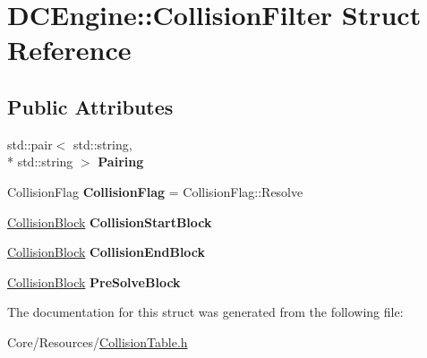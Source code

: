 \hypertarget{structDCEngine_1_1CollisionFilter}{\section{D\-C\-Engine\-:\-:Collision\-Filter Struct Reference}
\label{structDCEngine_1_1CollisionFilter}
}
\subsection*{Public Attributes}
\begin{DoxyCompactItemize}
\item 
\hypertarget{structDCEngine_1_1CollisionFilter_a2461259b77abd0b038f93900ffcf05d9}{std\-::pair$<$ std\-::string, \\*
std\-::string $>$ {\bfseries Pairing}}\label{structDCEngine_1_1CollisionFilter_a2461259b77abd0b038f93900ffcf05d9}

\item 
\hypertarget{structDCEngine_1_1CollisionFilter_affded1bf250f2b17612c2a2a9c46790b}{Collision\-Flag {\bfseries Collision\-Flag} = Collision\-Flag\-::\-Resolve}\label{structDCEngine_1_1CollisionFilter_affded1bf250f2b17612c2a2a9c46790b}

\item 
\hypertarget{structDCEngine_1_1CollisionFilter_ab5bd72452cd99e65a90fedb2e8a4ba69}{\hyperlink{structDCEngine_1_1CollisionBlock}{Collision\-Block} {\bfseries Collision\-Start\-Block}}\label{structDCEngine_1_1CollisionFilter_ab5bd72452cd99e65a90fedb2e8a4ba69}

\item 
\hypertarget{structDCEngine_1_1CollisionFilter_a333d84010f1c6d745fbcde0fe722cf5a}{\hyperlink{structDCEngine_1_1CollisionBlock}{Collision\-Block} {\bfseries Collision\-End\-Block}}\label{structDCEngine_1_1CollisionFilter_a333d84010f1c6d745fbcde0fe722cf5a}

\item 
\hypertarget{structDCEngine_1_1CollisionFilter_af0d6a8c4f729fd25ad52f06a2b95db2c}{\hyperlink{structDCEngine_1_1CollisionBlock}{Collision\-Block} {\bfseries Pre\-Solve\-Block}}\label{structDCEngine_1_1CollisionFilter_af0d6a8c4f729fd25ad52f06a2b95db2c}

\end{DoxyCompactItemize}


The documentation for this struct was generated from the following file\-:\begin{DoxyCompactItemize}
\item 
Core/\-Resources/\hyperlink{CollisionTable_8h}{Collision\-Table.\-h}\end{DoxyCompactItemize}
